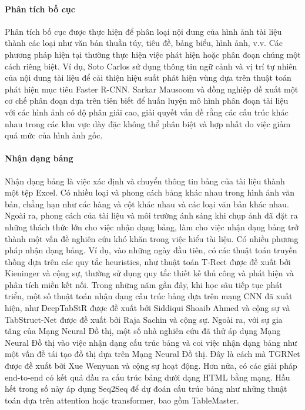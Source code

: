 \paragraph{Phân tích bố cục}
Phân tích bố cục được thực hiện để phân loại nội dung của hình ảnh tài liệu thành các loại như văn bản thuần túy, tiêu đề, bảng biểu, hình ảnh, v.v. Các phương pháp hiện tại thường thực hiện việc phát hiện hoặc phân đoạn chúng một cách riêng biệt. Ví dụ, Soto Carlos sử dụng thông tin ngữ cảnh và vị trí tự nhiên của nội dung tài liệu để cải thiện hiệu suất phát hiện vùng dựa trên thuật toán phát hiện mục tiêu Faster R-CNN. Sarkar Mausoom và đồng nghiệp đề xuất một cơ chế phân đoạn dựa trên tiên biết để huấn luyện mô hình phân đoạn tài liệu với các hình ảnh có độ phân giải cao, giải quyết vấn đề rằng các cấu trúc khác nhau trong các khu vực dày đặc không thể phân biệt và hợp nhất do việc giảm quá mức của hình ảnh gốc.

\paragraph{Nhận dạng bảng}
Nhận dạng bảng là việc xác định và chuyển thông tin bảng của tài liệu thành một tệp Excel. Có nhiều loại và phong cách bảng khác nhau trong hình ảnh văn bản, chẳng hạn như các hàng và cột khác nhau và các loại văn bản khác nhau. Ngoài ra, phong cách của tài liệu và môi trường ánh sáng khi chụp ảnh đã đặt ra những thách thức lớn cho việc nhận dạng bảng, làm cho việc nhận dạng bảng trở thành một vấn đề nghiên cứu khó khăn trong việc hiểu tài liệu. Có nhiều phương pháp nhận dạng bảng. Ví dụ, vào những ngày đầu tiên, có các thuật toán truyền thống dựa trên các quy tắc heuristics, như thuật toán T-Rect được đề xuất bởi Kieninger và cộng sự, thường sử dụng quy tắc thiết kế thủ công và phát hiện và phân tích miền kết nối. Trong những năm gần đây, khi học sâu tiếp tục phát triển, một số thuật toán nhận dạng cấu trúc bảng dựa trên mạng CNN đã xuất hiện, như DeepTabStR được đề xuất bởi Siddiqui Shoaib Ahmed và cộng sự và TabStruct-Net được đề xuất bởi Raja Sachin và cộng sự. Ngoài ra, với sự gia tăng của Mạng Neural Đồ thị, một số nhà nghiên cứu đã thử áp dụng Mạng Neural Đồ thị vào việc nhận dạng cấu trúc bảng và coi việc nhận dạng bảng như một vấn đề tái tạo đồ thị dựa trên Mạng Neural Đồ thị. Đây là cách mà TGRNet được đề xuất bởi Xue Wenyuan và cộng sự hoạt động. Hơn nữa, có các giải pháp end-to-end có kết quả đầu ra cấu trúc bảng dưới dạng HTML bằng mạng. Hầu hết trong số này áp dụng Seq2Seq để dự đoán cấu trúc bảng như những thuật toán dựa trên attention hoặc transformer, bao gồm TableMaster.


